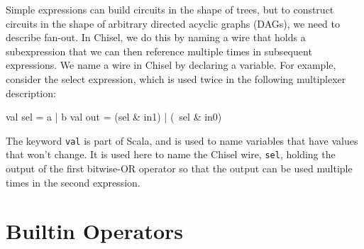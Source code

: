 \documentclass[twocolumn,10pt]{article}
\def\code#1{{\tt #1}}
\begin{document}
Simple expressions can build circuits in the shape of trees, but to
construct circuits in the shape of arbitrary directed acyclic graphs
(DAGs), we need to describe fan-out.  In Chisel, we do this by naming
a wire that holds a subexpression that we can then reference multiple
times in subsequent expressions.  We name a wire in Chisel by
declaring a variable.  For example, consider the select expression,
which is used twice in the following multiplexer description:
\begin{scala}
val sel = a | b
val out = (sel & in1) | (~sel & in0)
\end{scala}

\noindent
The keyword \code{val} is part of Scala, and is used to name variables
that have values that won't change.  It is used here to name the
Chisel wire, \code{sel}, holding the output of the first bitwise-OR
operator so that the output can be used multiple times in the second
expression.

\section{Builtin Operators}
\end{document}
